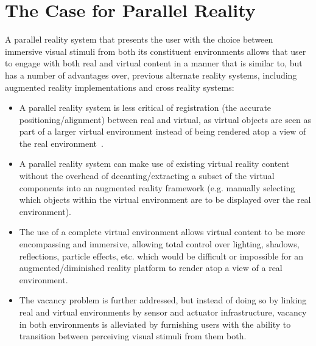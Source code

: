 



\section{The Case for Parallel Reality}
\label{caseforpr}

A parallel reality system that presents the user with the choice between immersive visual stimuli from both its constituent environments allows that user to engage with both real and virtual content in a manner that is similar to, but has a number of advantages over, previous alternate reality systems, including augmented reality implementations and cross reality systems:

\begin{itemize}
	\item A parallel reality system is less critical of registration (the accurate positioning/alignment) between real and virtual, as virtual objects are seen as part of a larger virtual environment instead of being rendered atop a view of the real environment~\cite{Azuma1997}.
	\item A parallel reality system can make use of existing virtual reality content without the overhead of decanting/extracting a subset of the virtual components into an augmented reality framework (e.g. manually selecting which objects within the virtual environment are to be displayed over the real environment).
	\item The use of a complete virtual environment allows virtual content to be more encompassing and immersive, allowing total control over lighting, shadows, reflections, particle effects, etc. which would be difficult or impossible for an augmented/diminished reality platform to render atop a view of a real environment.
	\item The vacancy problem is further addressed, but instead of doing so by linking real and virtual environments by sensor and actuator infrastructure, vacancy in both environments is alleviated by furnishing users with the ability to transition between perceiving visual stimuli from them both.
\end{itemize}

